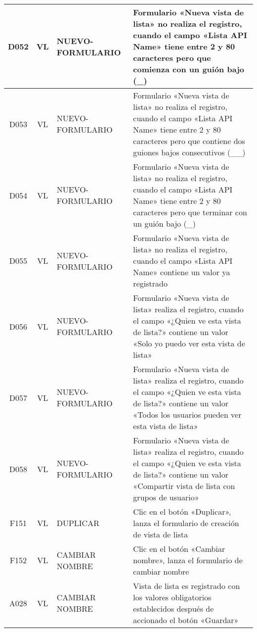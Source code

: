 \begin{landscape}
{\begin{longtable}[htb]{|c|c|p{3.8cm}|p{15.2cm}|}
\scriptsize{D052} & \scriptsize{VL} & \scriptsize{NUEVO-FORMULARIO} & \scriptsize{Formulario «Nueva vista de lista» no realiza el registro, cuando el campo «Lista API Name» tiene entre 2 y 80 caracteres pero que comienza con un guión bajo (\_)} \\ \hline
\scriptsize{D053} & \scriptsize{VL} & \scriptsize{NUEVO-FORMULARIO} & \scriptsize{Formulario «Nueva vista de lista» no realiza el registro, cuando el campo «Lista API Name» tiene entre 2 y 80 caracteres pero que contiene dos guiones bajos consecutivos (\_\_)} \\ \hline
\scriptsize{D054} & \scriptsize{VL} & \scriptsize{NUEVO-FORMULARIO} & \scriptsize{Formulario «Nueva vista de lista» no realiza el registro, cuando el campo «Lista API Name» tiene entre 2 y 80 caracteres pero que terminar con un guión bajo (\_)} \\ \hline
\scriptsize{D055} & \scriptsize{VL} & \scriptsize{NUEVO-FORMULARIO} & \scriptsize{Formulario «Nueva vista de lista» no realiza el registro, cuando el campo «Lista API Name» contiene un valor ya registrado} \\ \hline
\scriptsize{D056} & \scriptsize{VL} & \scriptsize{NUEVO-FORMULARIO} & \scriptsize{Formulario «Nueva vista de lista» realiza el registro, cuando el campo «¿Quien ve esta vista de lista?» contiene un valor «Solo yo puedo ver esta vista de lista»} \\ \hline
\scriptsize{D057} & \scriptsize{VL} & \scriptsize{NUEVO-FORMULARIO} & \scriptsize{Formulario «Nueva vista de lista» realiza el registro, cuando el campo «¿Quien ve esta vista de lista?» contiene un valor «Todos los usuarios pueden ver esta vista de lista»} \\ \hline
\scriptsize{D058} & \scriptsize{VL} & \scriptsize{NUEVO-FORMULARIO} & \scriptsize{Formulario «Nueva vista de lista» realiza el registro, cuando el campo «¿Quien ve esta vista de lista?» contiene un valor «Compartir vista de lista con grupos de usuario»} \\ \hline
\scriptsize{F151} & \scriptsize{VL} & \scriptsize{DUPLICAR} & \scriptsize{Clic en el botón «Duplicar», lanza el formulario de creación de vista de lista} \\ \hline
\scriptsize{F152} & \scriptsize{VL} & \scriptsize{CAMBIAR NOMBRE} & \scriptsize{Clic en el botón «Cambiar nombre», lanza el formulario de cambiar nombre} \\ \hline
\scriptsize{A028} & \scriptsize{VL} & \scriptsize{CAMBIAR NOMBRE} & \scriptsize{Vista de lista es registrado con los valores obligatorios establecidos después de accionado el botón «Guardar»} \\ \hline

\end{longtable}}
\end{landscape}
